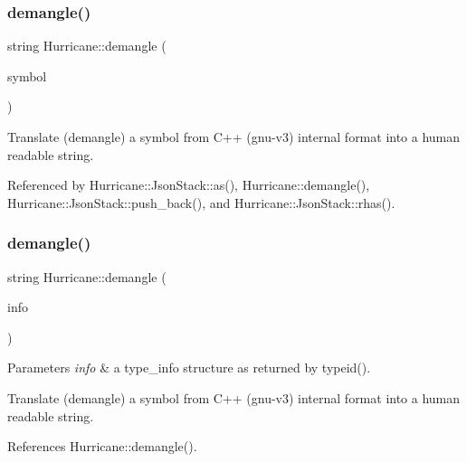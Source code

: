 \subsubsection{\texorpdfstring{demangle()}{demangle()}\hspace{0.1cm}{\footnotesize\ttfamily [1/2]}}
{\footnotesize\ttfamily string Hurricane\+::demangle (\begin{DoxyParamCaption}\item[{const char $\ast$}]{symbol }\end{DoxyParamCaption})}

Translate (demangle) a symbol from C++ ({\ttfamily gnu-\/v3}) internal format into a human readable {\ttfamily string}. 

Referenced by Hurricane\+::\+Json\+Stack\+::as(), Hurricane\+::demangle(), Hurricane\+::\+Json\+Stack\+::push\+\_\+back(), and Hurricane\+::\+Json\+Stack\+::rhas().

\mbox{\label{group__Generalities_gae4be209e8a3f2227b0c7a22246817c6f}} 
\subsubsection{\texorpdfstring{demangle()}{demangle()}\hspace{0.1cm}{\footnotesize\ttfamily [2/2]}}
{\footnotesize\ttfamily string Hurricane\+::demangle (\begin{DoxyParamCaption}\item[{const type\+\_\+info \&}]{info }\end{DoxyParamCaption})\hspace{0.3cm}{\ttfamily [inline]}}


\begin{DoxyParams}{Parameters}
{\em info} & a type\+\_\+info structure as returned by {\ttfamily typeid()}.\\
\hline
\end{DoxyParams}
Translate (demangle) a symbol from C++ ({\ttfamily gnu-\/v3}) internal format into a human readable {\ttfamily string}. 

References Hurricane\+::demangle().

